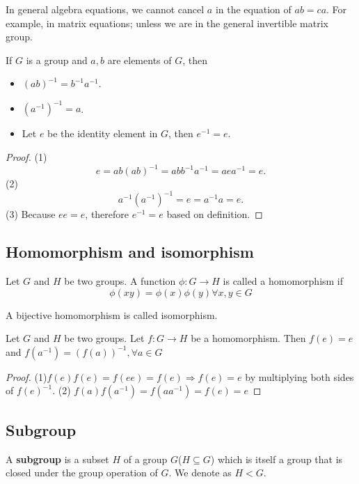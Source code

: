 \begin{refsection}
\begin{remark}
In general algebra equations, we cannot cancel $a$ in the equation of $ab=ca$. For example, in matrix equations; unless we are in the general invertible matrix group.
\end{remark}

\begin{lemma}
If $G$ is a group and $a,b$ are elements of $G$, then 
\begin{itemize}
    \item $(ab)^{-1} = b^{-1}a^{-1}$.
    \item $(a^{-1})^{-1} = a$.
    \item Let $e$ be the identity element in $G$, then $e^{-1} = e$.
\end{itemize}
\end{lemma}
\begin{proof}
(1)
$$e=ab(ab)^{-1} = abb^{-1}a^{-1}=aea^{-1} = e.$$
(2) $$a^{-1}(a^{-1})^{-1} = e = a^{-1}a = e.$$
(3) Because $ee=e$, therefore $e^{-1} = e$ based on definition.	
\end{proof}


\subsection{Homomorphism and isomorphism}
\begin{definition}[homomorphism]
Let $G$ and $H$ be two groups. A function $\phi:G\to H$ is called a homomorphism if
$$\phi(xy)=\phi(x)\phi(y) \forall x,y\in G$$
\end{definition}


\begin{definition}[isomorphism]
A bijective homomorphism is called isomorphism.
\end{definition}

\begin{theorem}
\cite[139]{pinter2012book} Let $G$ and $H$ be two groups. Let $f:G\to H$ be a homomorphism. Then
$f(e)=e$ and $f(a^{-1}) = (f(a))^{-1},\forall a\in G$
\end{theorem}
\begin{proof}
	(1)$f(e)f(e)=f(ee)=f(e) \Rightarrow f(e)=e$ by multiplying both sides of $f(e)^{-1}$. (2) $f(a)f(a^{-1}) = f(aa^{-1}) = f(e) = e$
\end{proof}


\subsection{Subgroup}
\begin{definition}
A \textbf{subgroup} is a subset $H$ of a group $G$($H \subseteq G$) which is itself a group that is closed under the group operation of $G$. We denote as $H < G$.
\end{definition}


\end{refsection}
